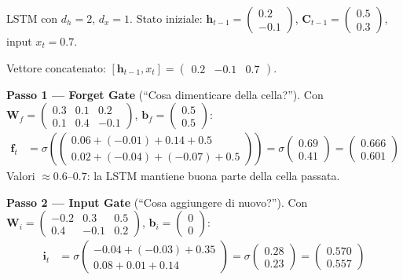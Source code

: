 \documentclass[12pt,a4paper]{article}
\begin{document}
\begin{examplebox}
LSTM con $d_h = 2$, $d_x = 1$. Stato iniziale: $\mathbf{h}_{t-1} = \begin{pmatrix} 0.2 \\ -0.1 \end{pmatrix}$, $\mathbf{C}_{t-1} = \begin{pmatrix} 0.5 \\ 0.3 \end{pmatrix}$, input $x_t = 0.7$.

Vettore concatenato: $[\mathbf{h}_{t-1}, x_t] = \begin{pmatrix} 0.2 & -0.1 & 0.7 \end{pmatrix}$.

\textbf{Passo 1 --- Forget Gate} (``Cosa dimenticare della cella?'').
Con $\mathbf{W}_f = \begin{pmatrix} 0.3 & 0.1 & 0.2 \\ 0.1 & 0.4 & -0.1 \end{pmatrix}$, $\mathbf{b}_f = \begin{pmatrix} 0.5 \\ 0.5 \end{pmatrix}$:
\begin{align*}
    \mathbf{f}_t &= \sigma\!\left(\begin{pmatrix} 0.06 + (-0.01) + 0.14 + 0.5 \\ 0.02 + (-0.04) + (-0.07) + 0.5 \end{pmatrix}\right) = \sigma\!\begin{pmatrix} 0.69 \\ 0.41 \end{pmatrix} = \begin{pmatrix} 0.666 \\ 0.601 \end{pmatrix}
\end{align*}
Valori $\approx 0.6$--$0.7$: la LSTM mantiene buona parte della cella passata.

\textbf{Passo 2 --- Input Gate} (``Cosa aggiungere di nuovo?'').
Con $\mathbf{W}_i = \begin{pmatrix} -0.2 & 0.3 & 0.5 \\ 0.4 & -0.1 & 0.2 \end{pmatrix}$, $\mathbf{b}_i = \begin{pmatrix} 0 \\ 0 \end{pmatrix}$:
\begin{align*}
    \mathbf{i}_t &= \sigma\!\begin{pmatrix} -0.04 + (-0.03) + 0.35 \\ 0.08 + 0.01 + 0.14 \end{pmatrix} = \sigma\!\begin{pmatrix} 0.28 \\ 0.23 \end{pmatrix} = \begin{pmatrix} 0.570 \\ 0.557 \end{pmatrix}
\end{align*}


\end{examplebox}
\end{document}
